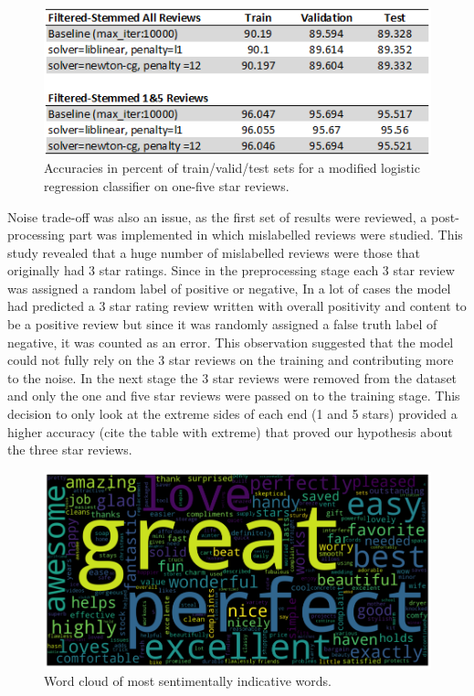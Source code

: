 \documentclass[conference]{IEEEtran}
\begin{document}
\begin{figure}[htbp]
\centerline{\includegraphics[width=0.9\columnwidth]{one-five-predictions.png}}
\caption{Accuracies in percent of train/valid/test sets for a modified logistic regression classifier on one-five star reviews.}
\label{fig} 
	
\end{figure}
\FloatBarrier
Noise trade-off was also an issue, as the first set of results were reviewed, a post-processing part was implemented in which mislabelled reviews were studied. This study revealed that a huge number of mislabelled reviews were those that originally had 3 star ratings. Since in the preprocessing stage each 3 star review was assigned a random label of positive or negative, In a lot of cases the model had predicted a 3 star rating review written with overall positivity and content to be a positive review but since it was randomly assigned a false truth label of negative, it was counted as an error. This observation suggested that the model could not fully rely on the 3 star reviews on the training and contributing more to the noise. In the next stage the 3 star reviews were removed from the dataset and only the one and five star reviews were passed on to the training stage. This decision to only look at the extreme sides of each end (1 and 5 stars) provided a higher accuracy (cite the table with extreme) that proved our hypothesis about the three star reviews.

\begin{figure}[htbp]
\centerline{\includegraphics[width=0.9\columnwidth]{word-cloud.png}}
\caption{Word cloud of most sentimentally indicative words.}
\label{fig}
\end{figure}
\FloatBarrier
\end{document}
